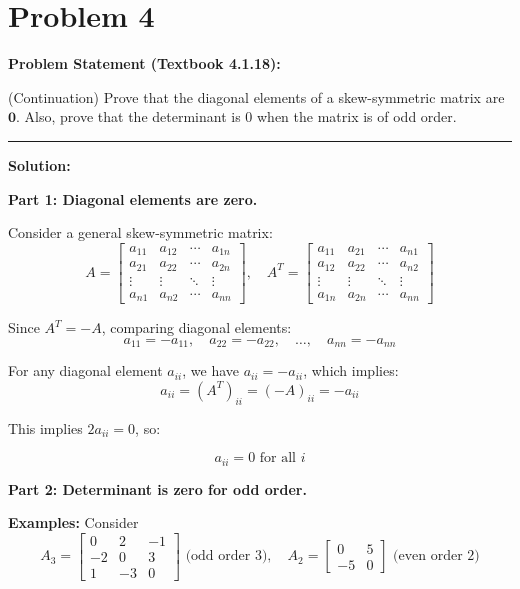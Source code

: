 \clearpage
\section*{Problem 4}

\textbf{Problem Statement (Textbook 4.1.18):} 

(Continuation) Prove that the diagonal elements of a skew-symmetric matrix are $\mathbf{0}$. Also, prove that the determinant is $0$ when the matrix is of odd order.

\noindent\rule{\textwidth}{0.4pt}

\vspace{1em}

\textbf{Solution:}

\textbf{Part 1: Diagonal elements are zero.}

Consider a general skew-symmetric matrix:
$$A = \begin{bmatrix} 
a_{11} & a_{12} & \cdots & a_{1n} \\
a_{21} & a_{22} & \cdots & a_{2n} \\
\vdots & \vdots & \ddots & \vdots \\
a_{n1} & a_{n2} & \cdots & a_{nn}
\end{bmatrix}, \quad A^T = \begin{bmatrix} 
a_{11} & a_{21} & \cdots & a_{n1} \\
a_{12} & a_{22} & \cdots & a_{n2} \\
\vdots & \vdots & \ddots & \vdots \\
a_{1n} & a_{2n} & \cdots & a_{nn}
\end{bmatrix}$$

Since $A^T = -A$, comparing diagonal elements:
$$a_{11} = -a_{11}, \quad a_{22} = -a_{22}, \quad \ldots, \quad a_{nn} = -a_{nn}$$

For any diagonal element $a_{ii}$, we have $a_{ii} = -a_{ii}$, which implies:
$$a_{ii} = (A^T)_{ii} = (-A)_{ii} = -a_{ii}$$

This implies $2a_{ii} = 0$, so:

$$\boxed{a_{ii} = 0 \text{ for all } i}$$

\vspace{1em}

\textbf{Part 2: Determinant is zero for odd order.}

\textbf{Examples:} Consider
$$A_3 = \begin{bmatrix} 0 & 2 & -1 \\ -2 & 0 & 3 \\ 1 & -3 & 0 \end{bmatrix} \text{ (odd order 3)}, \quad A_2 = \begin{bmatrix} 0 & 5 \\ -5 & 0 \end{bmatrix} \text{ (even order 2)}$$

